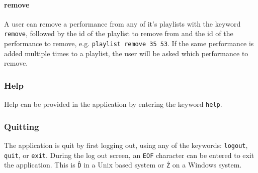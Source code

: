 \paragraph{remove}
A user can remove a performance from any of it's playlists with the keyword \texttt{remove}, followed
by the id of the playlist to remove from and the id of the performance to remove, e.g.
\texttt{playlist remove 35 53}. If the same performance is added multiple times to a playlist, the
user will be asked which performance to remove.

\subsubsection{Help}
Help can be provided in the application by entering the keyword \texttt{help}.

\subsubsection{Quitting}
The application is quit by first logging out, using any of the keywords: \texttt{logout}, \texttt{quit},
or \texttt{exit}. During the log out screen, an \texttt{EOF} character can be entered to exit the
application. This is \texttt{\^D} in a Unix based system or \texttt{\^Z} on a Windows system.

